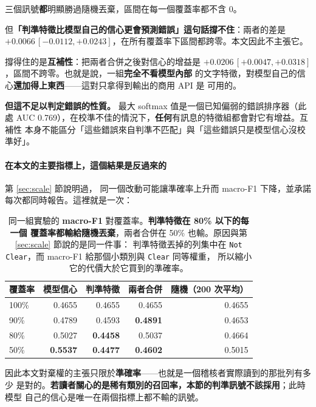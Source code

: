 \documentclass[11pt,a4paper]{ctexart}
\newcommand{\fn}[1]{\texttt{#1}}
\begin{document}
\begin{tcolorbox}[colback=gray!8, colframe=gray!55, title=這張表改寫了一個結論]
三個訊號\textbf{都}明顯勝過隨機丟棄，區間在每一個覆蓋率都不含 0。

\medskip
但\textbf{「判準特徵比模型自己的信心更會預測錯誤」這句話撐不住}：兩者的差是
$+0.0066\,[-0.0112, +0.0243]$，在所有覆蓋率下區間都跨零。本文因此不主張它。

\medskip
撐得住的是\textbf{互補性}：把兩者合併之後對信心的增益是
$+0.0206\,[+0.0047, +0.0318]$，區間不跨零。也就是說，一組\textbf{完全不看模型內部}
的文字特徵，對模型自己的信心\textbf{還加得上東西}——這對只拿得到輸出的商用 API 是
可用的。

\medskip
\textbf{但這不足以判定錯誤的性質。} 最大 softmax 值是一個已知偏弱的錯誤排序器（此處
AUC 0.769），在校準不佳的情況下，\textbf{任何}有訊息的特徵組都會對它有增益。互補性
本身不能區分「這些錯誤來自判準不匹配」與「這些錯誤只是模型信心沒校準好」。
\end{tcolorbox}

\paragraph{在本文的主要指標上，這個結果是反過來的} 第 \ref{sec:scale} 節說明過，
同一個改動可能讓準確率上升而 macro-F1 下降，並承諾每次都同時報告。這裡就是一次：

\begin{table}[h]
\centering\small
\begin{tabular}{@{}lrrrr@{}}
\toprule
覆蓋率 & 模型信心 & 判準特徵 & 兩者合併 & 隨機（200 次平均）\\
\midrule
100\% & 0.4655 & 0.4655 & 0.4655 & 0.4655 \\
90\% & 0.4789 & 0.4593 & \textbf{0.4891} & 0.4653 \\
80\% & 0.5027 & \textbf{0.4458} & 0.5037 & 0.4664 \\
50\% & \textbf{0.5537} & \textbf{0.4477} & \textbf{0.4602} & 0.5015 \\
\bottomrule
\end{tabular}
\caption{同一組實驗的 \textbf{macro-F1} 對覆蓋率。\textbf{判準特徵在 80\% 以下的每一個
覆蓋率都輸給隨機丟棄}，兩者合併在 50\% 也輸。原因與第 \ref{sec:scale} 節說的是同一件事：
判準特徵丟掉的列集中在 \fn{Not Clear}，而 macro-F1 給那個小類別與 \fn{Clear} 同等權重，
所以縮小它的代價大於它買到的準確率。}
\end{table}

\begin{tcolorbox}[colback=gray!8, colframe=gray!55]
因此本文對棄權的主張只限於\textbf{準確率}——也就是一個稽核者實際讀到的那批列有多少
是對的。\textbf{若讀者關心的是稀有類別的召回率，本節的判準訊號不該採用}；此時模型
自己的信心是唯一在兩個指標上都不輸的訊號。
\end{tcolorbox}
\end{document}
